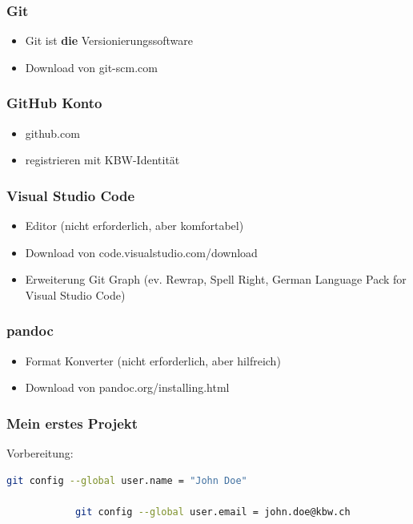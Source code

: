 \documentclass[table]{beamer}
\begin{document}
    \begin{frame}
        \frametitle{Git}

        \begin{itemize}
            \item Git ist \textbf{die} Versionierungssoftware
            \item Download von git-scm.com 
        \end{itemize}
    
    \end{frame}

    \begin{frame}
        \frametitle{GitHub Konto}

        \begin{itemize}
            \item github.com 
            \item registrieren mit KBW-Identität
        \end{itemize}
    \end{frame}

    \begin{frame}
        \frametitle{Visual Studio Code}

        \begin{itemize}
            \item Editor (nicht erforderlich, aber komfortabel)
            \item Download von code.visualstudio.com/download 
            \item Erweiterung Git Graph (ev. Rewrap, Spell Right, German
            Language Pack for Visual Studio Code)
        \end{itemize}
    
    \end{frame}

    \begin{frame}
        \frametitle{pandoc}

        \begin{itemize}
            \item Format Konverter (nicht erforderlich, aber hilfreich)
            \item Download von pandoc.org/installing.html
        \end{itemize}   
            
    \end{frame}

    \begin{frame}[fragile]
        \frametitle{Mein erstes Projekt}

        Vorbereitung:

        \begin{lstlisting}[language=Bash]
            git config --global user.name = "John Doe"

            git config --global user.email = john.doe@kbw.ch
        \end{lstlisting}  
    
    \end{frame}
\end{document}
